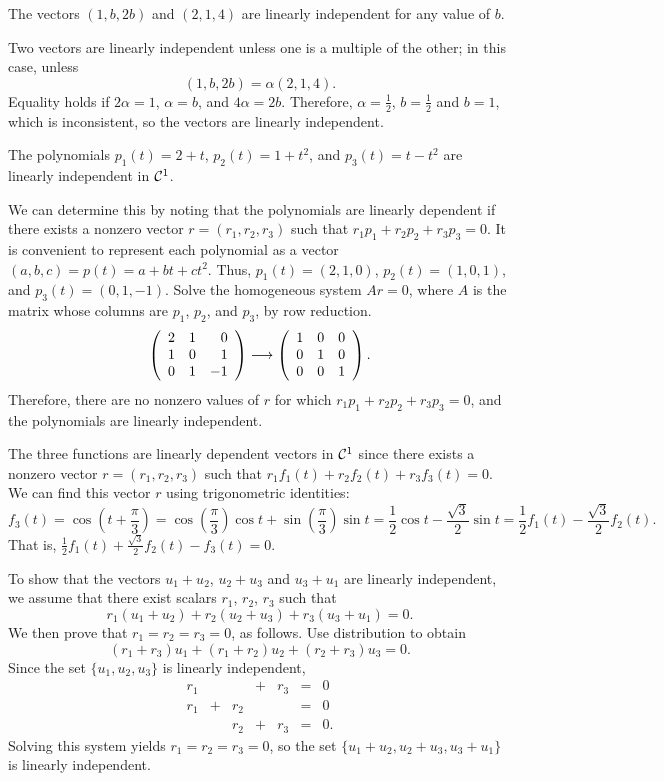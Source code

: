 \documentclass{ximera}
\begin{document}
\ans The vectors $(1,b,2b)$ and $(2,1,4)$ are linearly independent
for any value of $b$.

\soln Two vectors are linearly independent unless one is a multiple
of the other; in this case, unless
\[
(1,b,2b) = \alpha(2,1,4).
\]
Equality holds if $2\alpha = 1$, $\alpha = b$, and $4\alpha = 2b$.
Therefore, $\alpha = \frac{1}{2}$, $b = \frac{1}{2}$ and $b = 1$,
which is inconsistent, so the vectors are linearly independent.

\ans The polynomials $p_1(t) = 2 + t$, $p_2(t) = 1 + t^2$, and $p_3(t) =
t - t^2$ are linearly independent in ${\cal C}^1$.  

\soln We can determine this
by noting that the polynomials are linearly dependent if there exists
a nonzero vector $r = (r_1,r_2,r_3)$ such that $r_1p_1 + r_2p_2 +
r_3p_3 = 0$.  It is convenient to represent each polynomial as a
vector $(a,b,c) = p(t) = a + bt + ct^2$.  Thus, $p_1(t) = (2,1,0)$, 
$p_2(t) = (1,0,1)$, and $p_3(t) = (0,1,-1)$.  Solve the homogeneous
system $Ar = 0$, where $A$ is the matrix whose columns are $p_1$,
$p_2$, and $p_3$, by row reduction.
\[ \left(\begin{array}{rrr} 2 & 1 & 0 \\ 1 & 0 & 1 \\ 0 & 1 & -1\end{array}\right) \longrightarrow
\left(\begin{array}{rrr} 1 & 0 & 0 \\ 0 & 1 & 0 \\ 0 & 0 & 1\end{array}\right). \]
Therefore, there are no nonzero values of $r$ for which $r_1p_1 + 
r_2p_2 + r_3p_3 = 0$, and the polynomials are linearly independent.

\newpage
{}
The three functions are linearly dependent vectors in ${\cal C}^1$ since
there exists a nonzero vector $r = (r_1,r_2,r_3)$ such that
$r_1f_1(t) + r_2f_2(t) + r_3f_3(t) = 0$.  We can find this vector $r$
using trigonometric identities:
\[ f_3(t) = \cos\left(t + \frac{\pi}{3}\right) =
\cos\left(\frac{\pi}{3}\right)\cos t + \sin\left(\frac{\pi}{3}\right)\sin t
= \frac{1}{2}\cos t - \frac{\sqrt{3}}{2}\sin t =
\frac{1}{2}f_1(t) - \frac{\sqrt{3}}{2}f_2(t). \]
That is, $\frac{1}{2}f_1(t) + \frac{\sqrt{3}}{2}f_2(t) - f_3(t) = 0$.

To show that the vectors $u_1 + u_2$, $u_2 + u_3$ and $u_3 + u_1$
are linearly independent, we assume that there exist scalars $r_1$,
$r_2$, $r_3$ such that
\[ r_1(u_1 + u_2) + r_2(u_2 + u_3) + r_3(u_3 + u_1) = 0. \]
We then prove that $r_1 = r_2 = r_3 = 0$, as follows.
Use distribution to obtain
\[ (r_1 + r_3)u_1 + (r_1 + r_2)u_2 + (r_2 + r_3)u_3 = 0. \]
Since the set $\{u_1,u_2,u_3\}$ is linearly independent,
\[ \begin{array}{rrrrrcl}
r_1 & & & + & r_3 & = & 0 \\
r_1 & + & r_2 & & & = & 0 \\
& & r_2 & + & r_3 & = & 0. \end{array} \]
Solving this system yields $r_1 = r_2 = r_3 = 0$,
so the set $\{u_1 + u_2,u_2 + u_3,u_3 + u_1\}$ is linearly
independent.
\end{document}
